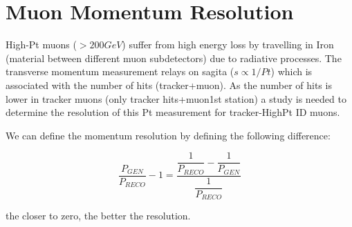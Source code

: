 \section{Muon Momentum Resolution}

High-Pt muons ($>200GeV$) suffer from high energy loss by travelling in Iron
(material between different muon subdetectors) due to radiative processes. The
transverse momentum measurement relays on sagita ($s \propto 1/Pt$) which is associated
with the number of hits (tracker+muon). As the number of hits is lower in
tracker muons (only tracker hits+muon1st station) a study is needed to determine
the resolution of this Pt measurement for tracker-HighPt ID muons.

We can define the momentum resolution by defining the following difference:

\begin{equation}
\frac{P_{GEN}}{P_{RECO}} - 1 = \frac{\dfrac{1}{P_{RECO}}-\dfrac{1}{P_{GEN}}}{\dfrac{1}{P_{RECO}}}
\end{equation}

the closer to zero, the better the resolution.
